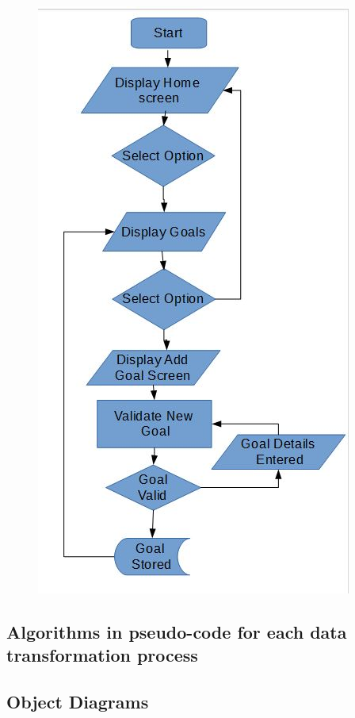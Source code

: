 \begin{figure}[H]
	\includegraphics{goalsFc}

\end{figure}
\subsection{Algorithms in pseudo-code for each data transformation process}

\subsection{Object Diagrams}

